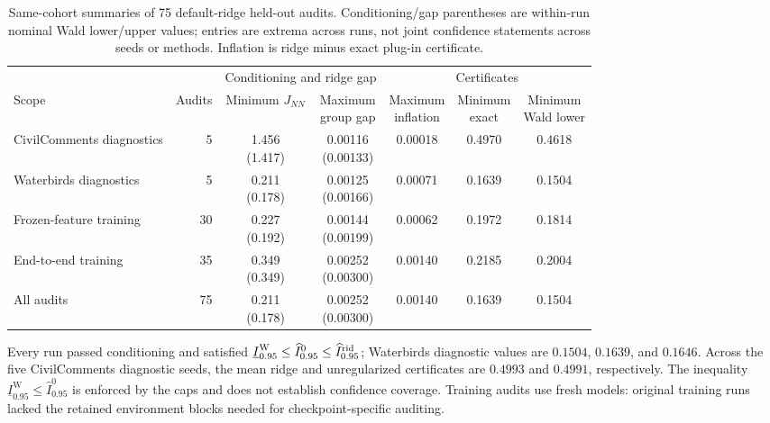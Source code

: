 \begin{table}[H]
\centering\small
\caption{Same-cohort summaries of 75 default-ridge held-out audits. Conditioning/gap parentheses are within-run nominal Wald lower/upper values; entries are extrema across runs, not joint confidence statements across seeds or methods. Inflation is ridge minus exact plug-in certificate.}
\label{tab:appB-conditioning}
\label{tab:appB-certificates}
\setlength{\tabcolsep}{3pt}
\begin{tabular}{@{}p{.27\linewidth}rccccc@{}}
\toprule
& & \multicolumn{2}{c}{Conditioning and ridge gap} & \multicolumn{3}{c}{Certificates}\\
Scope & Audits & \shortstack{Minimum\\$J_{NN}$} & \shortstack{Maximum\\group gap} & \shortstack{Maximum\\inflation} & \shortstack{Minimum\\exact} & \shortstack{Minimum\\Wald lower}\\
\midrule
CivilComments diagnostics & 5 & \shortstack{1.456\\(1.417)} & \shortstack{0.00116\\(0.00133)} & 0.00018 & 0.4970 & 0.4618\\
Waterbirds diagnostics & 5 & \shortstack{0.211\\(0.178)} & \shortstack{0.00125\\(0.00166)} & 0.00071 & 0.1639 & 0.1504\\
Frozen-feature training & 30 & \shortstack{0.227\\(0.192)} & \shortstack{0.00144\\(0.00199)} & 0.00062 & 0.1972 & 0.1814\\
End-to-end training & 35 & \shortstack{0.349\\(0.349)} & \shortstack{0.00252\\(0.00300)} & 0.00140 & 0.2185 & 0.2004\\
\midrule
All audits & 75 & \shortstack{0.211\\(0.178)} & \shortstack{0.00252\\(0.00300)} & 0.00140 & 0.1639 & 0.1504\\
\bottomrule
\end{tabular}
\end{table}

Every run passed conditioning and satisfied $\underline I_{0.95}^{\mathrm W}\le\widehat I_{0.95}^{0}\le\widehat I_{0.95}^{\mathrm{rid}}$; Waterbirds diagnostic values are $0.1504$, $0.1639$, and $0.1646$. Across the five CivilComments diagnostic seeds, the mean ridge and unregularized certificates are $0.4993$ and $0.4991$, respectively. The inequality $\underline I_{0.95}^{\mathrm W}\le\widehat I_{0.95}^{0}$ is enforced by the caps and does not establish confidence coverage. Training audits use fresh models: original training runs lacked the retained environment blocks needed for checkpoint-specific auditing.


